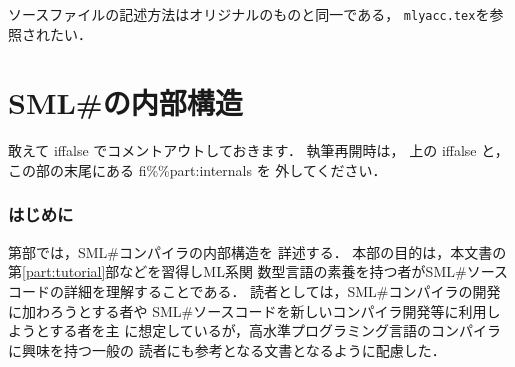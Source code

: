 \documentclass{jbook}
\newif\ifjp
\newcommand{\txt}[2]{#1}
\newcommand{\smlsharp}{SML\#}
\newcommand{\code}[1]{\mbox{\large\tt #1}}
\begin{document}
	ソースファイルの記述方法はオリジナルのものと同一である，
\code{mlyacc.tex}を参照されたい．
\else%
\fi%

%
%	
%

% 
\ifjp%
\else%
\fi%

\part{\txt{\smlsharp{}の内部構造}{\smlsharp{} Internals and Data Structures}}
\label{part:internals}

\iffalse%
敢えて iffalse でコメントアウトしておきます．
執筆再開時は，
上の iffalse と，
この部の末尾にある fi\%\%part:internals を
外してください．

\section*{\txt{はじめに}{Preface}}
\ifjp%
	第\ref{part:internals}部では，\smlsharp{}コンパイラの内部構造を
詳述する．
	本部の目的は，本文書の第\ref{part:tutorial}部などを習得しML系関
数型言語の素養を持つ者が\smlsharp{}ソースコードの詳細を理解することである．
	読者としては，\smlsharp{}コンパイラの開発に加わろうとする者や
\smlsharp{}ソースコードを新しいコンパイラ開発等に利用しようとする者を主
に想定しているが，高水準プログラミング言語のコンパイラに興味を持つ一般の
読者にも参考となる文書となるように配慮した．
\end{document}
